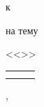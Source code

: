 \begin{center}
\begin{center}
		\vspace{0.35cm}

		к\xspace\doctypeb

		\vspace{0.4cm}



		{\smaller[1]
			на тему

			<<\Title>>}
	\end{center}

	\vspace{3.0cm}

	\large

	\begin{tabular}{p{}P{0.25\textwidth}P{0.25\textwidth}}
		 \\[10pt]
		             \\[10pt]
	\end{tabular}

	\vspace{4.5cm}

	\City, \Year

\end{center}




